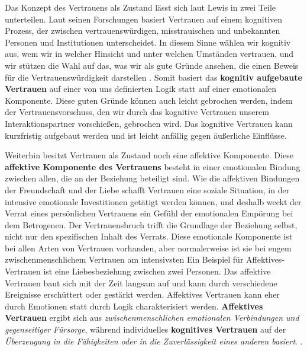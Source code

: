 \documentclass[a4paper,11pt]{article}%
\renewcommand{\\}{\vspace*{0.5\baselineskip} \newline}
\begin{document}
Das Konzept des Vertrauens als Zustand lässt sich laut Lewis \citep[p.970-971]{lewis1985trust} in zwei Teile unterteilen.\newline
Laut seinen Forschungen basiert Vertrauen \dq auf einem kognitiven Prozess, der zwischen vertrauenswürdigen, misstrauischen und unbekannten Personen und Institutionen unterscheidet. In diesem Sinne wählen wir kognitiv aus, wem wir in welcher Hinsicht und unter welchen Umständen vertrauen, und wir stützen die Wahl auf das, was wir als \dq gute Gründe\dq{} ansehen, die einen Beweis für die Vertrauenswürdigkeit darstellen \dq{}\citep[p.970]{lewis1985trust}.
Somit basiert das \textbf{kognitiv aufgebaute Vertrauen} auf einer von uns definierten Logik statt auf einer emotionalen Komponente. Diese \dq{}guten Gründe\dq{} können auch leicht gebrochen werden, indem der Vertrauensvorschuss, den wir durch das kognitive Vertrauen unserem Interaktionspartner vorschießen, gebrochen wird.
Das kognitive Vertrauen kann kurzfristig aufgebaut werden und ist leicht anfällig gegen äußerliche Einflüsse. 

Weiterhin besitzt Vertrauen als \dq{}Zustand\dq{} noch eine affektive Komponente.\\ \dq Diese \textbf{affektive Komponente des Vertrauens} besteht in einer emotionalen Bindung zwischen allen, die an der Beziehung beteiligt sind. Wie die affektiven Bindungen der Freundschaft und der Liebe schafft Vertrauen eine soziale Situation, in der intensive emotionale Investitionen getätigt werden können, und deshalb weckt der Verrat eines persönlichen Vertrauens ein Gefühl der emotionalen Empörung bei dem Betrogenen. Der Vertrauensbruch trifft die Grundlage der Beziehung selbst, nicht nur den spezifischen Inhalt des Verrats. Diese emotionale Komponente ist bei allen Arten von Vertrauen vorhanden, aber normalerweise ist sie bei engem zwischenmenschlichem Vertrauen am intensivsten \dq{} \citep[p.971]{lewis1985trust}
\\
Ein Beispiel für Affektives-Vertrauen ist eine Liebesbeziehung zwischen zwei Personen. Das affektive Vertrauen baut sich mit der Zeit langsam auf und kann durch verschiedene Ereignisse erschüttert oder gestärkt werden. Affektives Vertrauen kann eher durch Emotionen statt durch Logik charakterisiert werden.
\textbf{Affektives Vertrauen} ergibt sich aus \textit{zwischenmenschlichen emotionalen Verbindungen und gegenseitiger Fürsorge}, während individuelles \textbf{kognitives Vertrauen} auf der \textit{Überzeugung in die Fähigkeiten oder in die Zuverlässigkeit eines anderen basiert}. \citep[p.30]{mcallister1995affect}.
\end{document}
